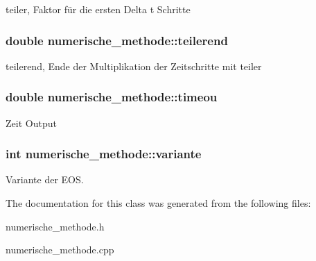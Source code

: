 teiler, Faktor für die ersten Delta t Schritte \hypertarget{classnumerische__methode_af29a77417f125560c1797aed70cd7ad5}{
\subsubsection[{teilerend}]{\setlength{\rightskip}{0pt plus 5cm}double numerische\-\_\-methode\-::teilerend\hspace{0.3cm}{\ttfamily [protected]}}}\label{classnumerische__methode_af29a77417f125560c1797aed70cd7ad5}
teilerend, Ende der Multiplikation der Zeitschritte mit teiler \hypertarget{classnumerische__methode_af0e0a81815451c4ed37f0ad73d4c5dbe}{
\subsubsection[{timeou}]{\setlength{\rightskip}{0pt plus 5cm}double numerische\-\_\-methode\-::timeou\hspace{0.3cm}{\ttfamily [protected]}}}\label{classnumerische__methode_af0e0a81815451c4ed37f0ad73d4c5dbe}
Zeit Output \hypertarget{classnumerische__methode_a98b4b3256bbcd2306acbe4d69f5258f7}{
\subsubsection[{variante}]{\setlength{\rightskip}{0pt plus 5cm}int numerische\-\_\-methode\-::variante\hspace{0.3cm}{\ttfamily [protected]}}}\label{classnumerische__methode_a98b4b3256bbcd2306acbe4d69f5258f7}
Variante der E\-O\-S. 

The documentation for this class was generated from the following files\-:\begin{DoxyCompactItemize}
\item 
numerische\-\_\-methode.\-h\item 
numerische\-\_\-methode.\-cpp\end{DoxyCompactItemize}

